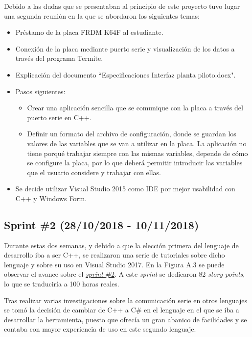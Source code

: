 
Debido a las dudas que se presentaban al principio de este proyecto tuvo lugar una segunda reunión en la que se abordaron los siguientes temas:
\begin{itemize}
	\item Préstamo de la placa FRDM K64F al estudiante.
	\item Conexión de la placa mediante puerto serie y visualización de los datos a través del programa Termite.
	\item Explicación del documento ``Especificaciones Interfaz planta piloto.docx".
	\item Pasos siguientes:
	\begin{itemize}
		\item Crear una aplicación sencilla que se comunique con la placa a través del puerto serie en C++.
		\item Definir un formato del archivo de configuración, donde se guardan los valores de las variables que se van a utilizar en la placa. La aplicación no tiene porqué trabajar siempre con las mismas variables, depende de cómo se configure la placa, por lo que deberá permitir introducir las variables que el usuario considere y trabajar con ellas.
	\end{itemize}
	\item Se decide utilizar Visual Studio 2015 como IDE por mejor usabilidad con C++ y Windows Form.
\end{itemize}

\subsection{Sprint \#2 (28/10/2018 - 10/11/2018)}

Durante estas dos semanas, y debido a que la elección primera del lenguaje de desarrollo iba a ser C++, se realizaron una serie de tutoriales sobre dicho lenguaje y sobre su uso en Visual Studio 2017. En la Figura A.3 se puede observar el avance sobre el \href{https://github.com/FranBurgos/TFG/milestone/3?closed=1}{\textit{sprint} \#2}. A este \textit{sprint} se dedicaron 82 \textit{story points}, lo que se traduciría a 100 horas reales.


Tras realizar varias investigaciones sobre la comunicación serie en otros lenguajes se tomó la decisión de cambiar de C++ a C\# en el lenguaje en el que se iba a desarrollar la herramienta, puesto que ofrecía un gran abanico de facilidades y se contaba con mayor experiencia de uso en este segundo lenguaje.

